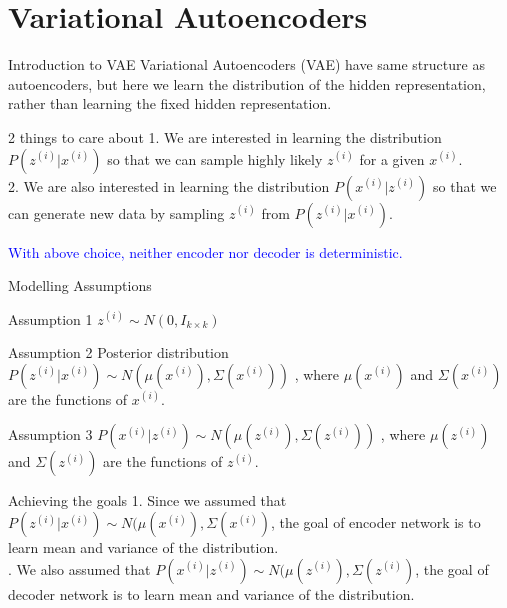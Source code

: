 \section*{Variational Autoencoders}

\begin{frame}{Introduction to VAE}
    Variational Autoencoders (VAE) have same structure as autoencoders, but here we learn the distribution of the hidden representation, rather than learning the fixed hidden representation.

    \pause 
    \begin{block}{2 things to care about}
        1. We are interested in learning the distribution $P(z^{(i)}|x^{(i)})$ so that we can sample highly likely $z^{(i)}$ for a given $x^{(i)}$.\\
        2. We are also interested in learning the distribution $P(x^{(i)}|z^{(i)})$ so that we can generate new data by sampling $z^{(i)}$ from $P(z^{(i)}|x^{(i)})$.
    \end{block}

    \textcolor{blue}{With above choice, neither encoder nor decoder is deterministic.}
\end{frame}

\begin{frame}{Modelling Assumptions}
    \begin{block}{Assumption 1}
        $z^{(i)} \sim N(0, I_{k \times k})$ \\
    \end{block}

    \begin{block}{Assumption 2}
        Posterior distribution $P(z^{(i)}|x^{(i)}) \sim N(\mu(x^{(i)}), \Sigma(x^{(i)}))$ , where $\mu(x^{(i)})$ and $\Sigma(x^{(i)})$ are the functions of $x^{(i)}$.
    \end{block}

    \begin{block}{Assumption 3}
        $P(x^{(i)}|z^{(i)}) \sim N(\mu(z^{(i)}), \Sigma(z^{(i)}))$ , where $\mu(z^{(i)})$ and $\Sigma(z^{(i)})$ are the functions of $z^{(i)}$.
    \end{block}
\end{frame}

\begin{frame}{Achieving the goals}
    1. Since we assumed that $P(z^{(i)}|x^{(i)}) \sim N(\mu(x^{(i)}), \Sigma(x^{(i)})$, the goal of encoder network is to learn mean and variance of the distribution.\\ 
    . We also assumed that $P(x^{(i)}|z^{(i)}) \sim N(\mu(z^{(i)}), \Sigma(z^{(i)})$, the goal of decoder network is to learn mean and variance of the distribution.\\
\end{frame}

